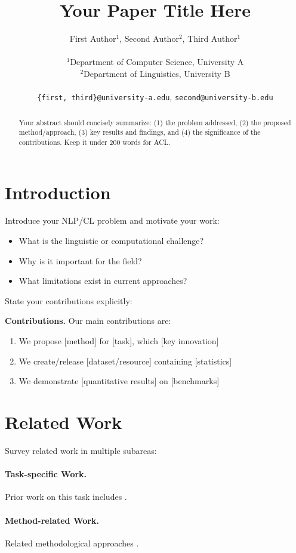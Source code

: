 \documentclass[11pt]{article}
\title{Your Paper Title Here}
\author{First Author$^{1}$, Second Author$^{2}$, Third Author$^{1}$\\
\\
$^{1}$Department of Computer Science, University A\\
$^{2}$Department of Linguistics, University B\\
\\
\texttt{\{first, third\}@university-a.edu}, \texttt{second@university-b.edu}
}
\begin{document}
\maketitle

\begin{abstract}
Your abstract should concisely summarize: (1) the problem addressed,
(2) the proposed method/approach, (3) key results and findings, and
(4) the significance of the contributions. Keep it under 200 words for ACL.
\end{abstract}

\section{Introduction}
\label{sec:introduction}

Introduce your NLP/CL problem and motivate your work:
\begin{itemize}
    \item What is the linguistic or computational challenge?
    \item Why is it important for the field?
    \item What limitations exist in current approaches?
\end{itemize}

State your contributions explicitly:

\textbf{Contributions.} Our main contributions are:
\begin{enumerate}
    \item We propose [method] for [task], which [key innovation]
    \item We create/release [dataset/resource] containing [statistics]
    \item We demonstrate [quantitative results] on [benchmarks]
\end{enumerate}

\section{Related Work}
\label{sec:related}

Survey related work in multiple subareas:

\paragraph{Task-specific Work.} Prior work on this task includes \cite{author2023paper}.

\paragraph{Method-related Work.} Related methodological approaches \cite{method2022}.
\end{document}
